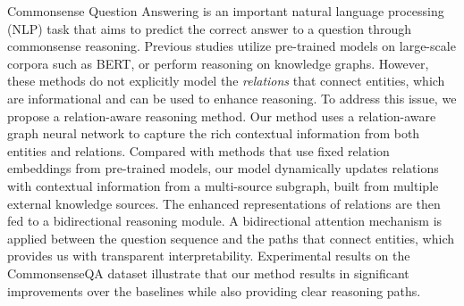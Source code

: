 Commonsense Question Answering is an important natural language processing (NLP) task that aims to predict the correct answer to a question through commonsense reasoning. Previous studies utilize pre-trained models on large-scale corpora such as BERT, or perform reasoning on knowledge graphs. However, these methods do not explicitly model the \textit{relations} that connect entities, which are informational and can be used to enhance reasoning. To address this issue, we propose a relation-aware reasoning method. Our method uses a relation-aware graph neural network to capture the rich contextual information from both entities and relations. Compared with methods that use fixed relation embeddings from pre-trained models, our model dynamically updates relations with contextual information from a multi-source subgraph, built from multiple external knowledge sources. The enhanced representations of relations are then fed to a bidirectional reasoning module. A bidirectional attention mechanism is applied between the question sequence and the paths that connect entities, which provides us with transparent interpretability. Experimental results on the CommonsenseQA dataset illustrate that our method results in significant improvements over the baselines while also providing clear reasoning paths.
